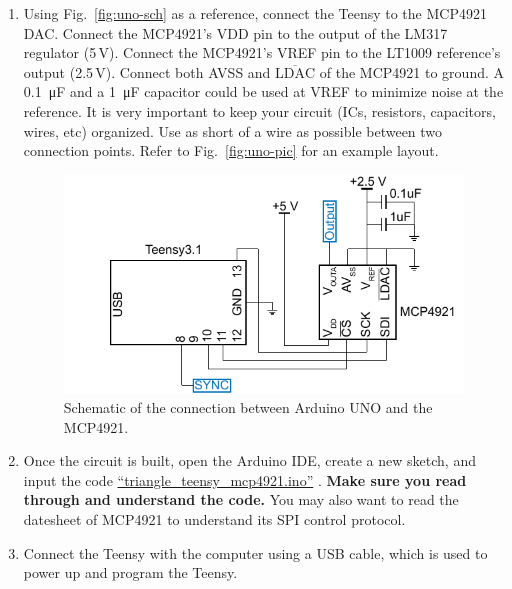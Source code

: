 \documentclass[letterpaper, 11pt]{article}
\begin{document}
\begin{enumerate}
	\item Using Fig.~\ref{fig:uno-sch} as a reference, connect the Teensy to the MCP4921 DAC. Connect the MCP4921's VDD pin to the output of the LM317 regulator (5\,V). Connect the MCP4921's VREF pin to the LT1009 reference's output (2.5\,V). Connect both AVSS and $\overline{\text{LDAC}}$ of the MCP4921 to ground. A \SI{0.1}{\micro\farad} and a \SI{1}{\micro\farad} capacitor could be used at VREF to minimize noise at the reference. It is very important to keep your circuit (ICs, resistors, capacitors, wires, etc) organized. Use as short of a wire as possible between two connection points. Refer to Fig.~\ref{fig:uno-pic} for an example layout.
	


	\begin{figure}[h]
		\centering
		\includegraphics{uno-sch}
		\caption{Schematic of the connection between Arduino UNO and the MCP4921.}
		\label{fig:dac-sch}
	\end{figure}


\item Once the circuit is built, open the Arduino IDE, create a new sketch, and input the code \href{https://github.com/ucdart/UCD-EEC134/blob/master/Lab1/triangle.ino}{``triangle\_teensy\_mcp4921.ino''} . \textbf{Make sure you read through and understand the code.} You may also want to read the datesheet of MCP4921 to understand its SPI control protocol. 

\item Connect the Teensy with the computer using a USB cable, which is used to power up and program the Teensy.


\end{enumerate}
\end{document}
